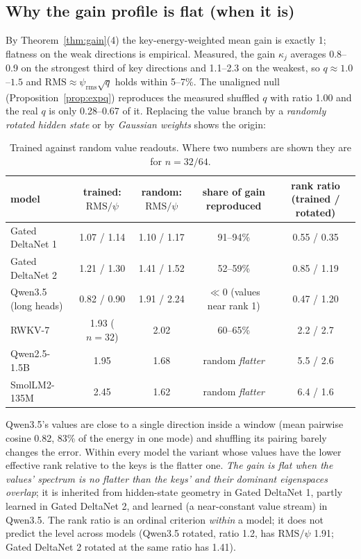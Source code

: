 \subsection{Why the gain profile is flat (when it is)}
By Theorem~\ref{thm:gain}(4) the key-energy-weighted mean gain is exactly 1; flatness on the weak directions is empirical. Measured, the gain $\kappa_j$ averages 0.8--0.9 on the strongest third of key directions and 1.1--2.3 on the weakest, so $q\approx1.0$--$1.5$ and $\mathrm{RMS}\approx\psi_{\mathrm{rms}}\sqrt q$ holds within 5--7\%. The unaligned null (Proposition~\ref{prop:expq}) reproduces the measured shuffled $q$ with ratio 1.00 and the real $q$ is only 0.28--0.67 of it. Replacing the value branch by a \emph{randomly rotated hidden state} or by \emph{Gaussian weights} shows the origin:

\begin{table}[!htbp]
  \caption{Trained against random value readouts. Where two numbers are shown they are for $n=32/64$.}
  \centering\scriptsize\setlength{\tabcolsep}{3.5pt}
  \begin{tabular}{lcccc}
    \toprule
    model & trained: $\mathrm{RMS}/\psi$ & random: $\mathrm{RMS}/\psi$ & share of gain reproduced & rank ratio (trained / rotated) \\
    \midrule
    Gated DeltaNet 1 & 1.07 / 1.14 & 1.10 / 1.17 & 91--94\% & 0.55 / 0.35 \\
    Gated DeltaNet 2 & 1.21 / 1.30 & 1.41 / 1.52 & 52--59\% & 0.85 / 1.19 \\
    Qwen3.5 (long heads) & 0.82 / 0.90 & 1.91 / 2.24 & $\ll0$ (values near rank 1) & 0.47 / 1.20 \\
    RWKV-7 & 1.93 ($n{=}32$) & 2.02 & 60--65\% & 2.2 / 2.7 \\
    Qwen2.5-1.5B & 1.95 & 1.68 & random \emph{flatter} & 5.5 / 2.6 \\
    SmolLM2-135M & 2.45 & 1.62 & random \emph{flatter} & 6.4 / 1.6 \\
    \bottomrule
  \end{tabular}
\end{table}
Qwen3.5's values are close to a single direction inside a window (mean pairwise cosine 0.82, 83\% of the energy in one mode) and shuffling its pairing barely changes the error. Within every model the variant whose values have the lower effective rank relative to the keys is the flatter one. \emph{The gain is flat when the values' spectrum is no flatter than the keys' and their dominant eigenspaces overlap}; it is inherited from hidden-state geometry in Gated DeltaNet 1, partly learned in Gated DeltaNet 2, and learned (a near-constant value stream) in Qwen3.5. The rank ratio is an ordinal criterion \emph{within} a model; it does not predict the level across models (Qwen3.5 rotated, ratio 1.2, has $\mathrm{RMS}/\psi$ 1.91; Gated DeltaNet 2 rotated at the same ratio has 1.41).

